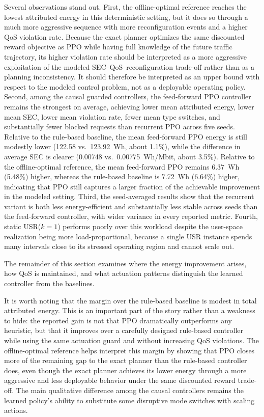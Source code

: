\documentclass[a4paper,fleqn]{cas-sc}
\begin{document}
Several observations stand out. First, the offline-optimal reference reaches the lowest attributed energy in this deterministic setting, but it does so through a much more aggressive sequence with more reconfiguration events and a higher QoS violation rate. Because the exact planner optimizes the same discounted reward objective as PPO while having full knowledge of the future traffic trajectory, its higher violation rate should be interpreted as a more aggressive exploitation of the modeled SEC--QoS--reconfiguration trade-off rather than as a planning inconsistency. It should therefore be interpreted as an upper bound with respect to the modeled control problem, not as a deployable operating policy. Second, among the causal guarded controllers, the feed-forward PPO controller remains the strongest on average, achieving lower mean attributed energy, lower mean SEC, lower mean violation rate, fewer mean type switches, and substantially fewer blocked requests than recurrent PPO across five seeds. Relative to the rule-based baseline, the mean feed-forward PPO energy is still modestly lower (122.58 vs.~123.92~Wh, about 1.1\%), while the difference in average SEC is clearer (0.00748 vs.~0.00775~Wh/Mbit, about 3.5\%). Relative to the offline-optimal reference, the mean feed-forward PPO remains 6.37~Wh (5.48\%) higher, whereas the rule-based baseline is 7.72~Wh (6.64\%) higher, indicating that PPO still captures a larger fraction of the achievable improvement in the modeled setting. Third, the seed-averaged results show that the recurrent variant is both less energy-efficient and substantially less stable across seeds than the feed-forward controller, with wider variance in every reported metric. Fourth, static USR($k=1$) performs poorly over this workload despite the user-space realization being more load-proportional, because a single USR instance spends many intervals close to its stressed operating region and cannot scale out.

The remainder of this section examines where the energy improvement arises, how QoS is maintained, and what actuation patterns distinguish the learned controller from the baselines.

It is worth noting that the margin over the rule-based baseline is modest in total attributed energy. This is an important part of the story rather than a weakness to hide: the reported gain is not that PPO dramatically outperforms any heuristic, but that it improves over a carefully designed rule-based controller while using the same actuation guard and without increasing QoS violations. The offline-optimal reference helps interpret this margin by showing that PPO closes more of the remaining gap to the exact planner than the rule-based controller does, even though the exact planner achieves its lower energy through a more aggressive and less deployable behavior under the same discounted reward trade-off. The main qualitative difference among the causal controllers remains the learned policy's ability to substitute some disruptive mode switches with scaling actions.
\end{document}
